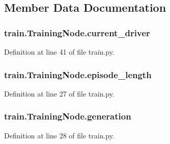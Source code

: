 \subsection{Member Data Documentation}
\subsubsection[{\texorpdfstring{current\+\_\+driver}{current_driver}}]{\setlength{\rightskip}{0pt plus 5cm}train.\+Training\+Node.\+current\+\_\+driver}\hypertarget{classtrain_1_1_training_node_a81d0481151f7b23e6489027fa1a87e47}{}\label{classtrain_1_1_training_node_a81d0481151f7b23e6489027fa1a87e47}


Definition at line 41 of file train.\+py.

\subsubsection[{\texorpdfstring{episode\+\_\+length}{episode_length}}]{\setlength{\rightskip}{0pt plus 5cm}train.\+Training\+Node.\+episode\+\_\+length}\hypertarget{classtrain_1_1_training_node_a58926a0e5681d22983ca345ebb7771bd}{}\label{classtrain_1_1_training_node_a58926a0e5681d22983ca345ebb7771bd}


Definition at line 27 of file train.\+py.

\subsubsection[{\texorpdfstring{generation}{generation}}]{\setlength{\rightskip}{0pt plus 5cm}train.\+Training\+Node.\+generation}\hypertarget{classtrain_1_1_training_node_a3ba5470e3146e9bb1303ed906b868d28}{}\label{classtrain_1_1_training_node_a3ba5470e3146e9bb1303ed906b868d28}


Definition at line 28 of file train.\+py.

